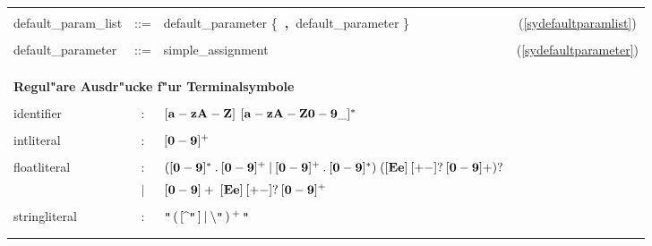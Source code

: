\begin{tabular}{lclc}
& & & \\
  {default\_param\_list} & ::= & {default\_parameter \{{\bf ~,~}default\_parameter \}} & (\ref{sydefaultparamlist}) \\
& & & \\
  {default\_parameter} & ::= & {simple\_assignment}   & (\ref{sydefaultparameter}) \\ 
& & & \\
& & & \\ 
& & & \\
\multicolumn{4}{l}{\large {\bf Regul"are Ausdr"ucke f"ur Terminalsymbole}} \\
& & & \\ 
  identifier & : & ${\bf [a-zA-Z]}$ ${\bf [a-zA-Z0-9\_]^*}$ & \\
& & & \\
  intliteral\index{Literal!ganzzahliges} & :   & ${\bf [0-9]^+}$  & \\
& & & \\
  floatliteral\index{Literal!rationales} & :   & ${\bf ([0-9]^*\:.\:[0-9]^+\:|\:[0-9]^+\:.\:[0-9]^*) \; ([Ee]\:[+-]?\:[0-9]+)?}$   & \\
		     & $|$ & ${\bf [0-9]+\;[Ee]\:[+-]?\:[0-9]^+}$ & \\
& & & \\
  stringliteral\index{Literal!Zeichenkette} & : & {\bf $ \verb&"& \,(\, [\: \widehat{} \: \verb&"&\, ] \: | \: \backslash \verb&"&\,)\,^+\,\verb&"&$} & \\
& & & \\
& & & \\
\end{tabular}




\normalsize


